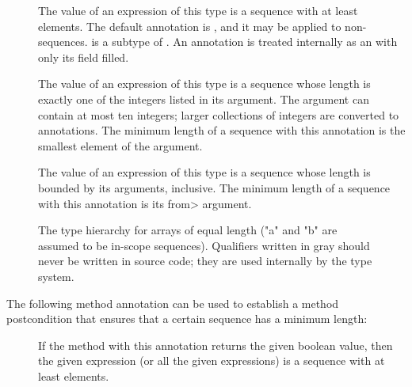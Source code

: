\begin{description}
\item[]
  The value of an expression of this type is a sequence with at least
   elements.  The default annotation is
  , and it may be applied to non-sequences.
   is a subtype of .
  An  annotation is treated internally as an
   with only its
   field filled.
\item[]
  The value of an expression of this type is a sequence whose
  length is exactly one of the integers listed in its argument.
  The argument can contain at most ten integers; larger collections of
  integers are converted to 
  annotations. The minimum length of a sequence with this annotation
  is the smallest element of the argument.
\item[]
  The value of an expression of this type is a sequence whose
  length is bounded by its arguments, inclusive.
  The minimum length of a sequence with this annotation is its \<from> argument.
\end{description}

\begin{figure}
\begin{center}
  \hfill
  \hfill
\end{center}
  \caption{The type hierarchy for arrays of equal length ("a" and "b" are
    assumed to be in-scope sequences).  Qualifiers
    written in gray should never be written in source code; they are used
    internally by the type system.}
  \label{fig-index-array-types}
\end{figure}

The following method annotation can be used to establish a method postcondition
that ensures that a certain sequence has a minimum length:

\begin{description}
\item[]
  If the method with this annotation returns the given boolean value,
  then the given expression (or all the given expressions) is a sequence
  with at least  elements.
\end{description}

